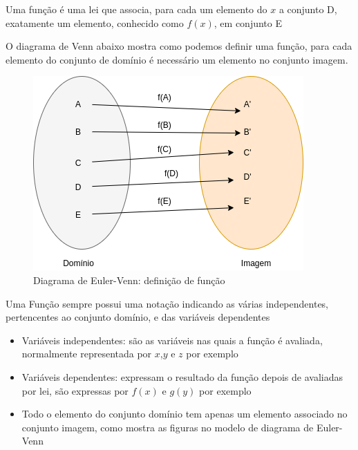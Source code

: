 \begin{multicols*}{2}
    \begin{theorem}
        Uma função é uma lei que associa, para cada um elemento do $x$ a conjunto D, exatamente 				um elemento, conhecido como $f(x)$, em conjunto E
    \end{theorem}

    O diagrama de Venn abaixo mostra como podemos definir uma função, para cada elemento do 				conjunto de domínio é necessário um elemento no conjunto imagem.

    \begin{figure}[H]
        \centering
        \caption{Diagrama de Euler-Venn: definição de função}
        \includegraphics[scale=0.4]{assets/rafael/img.png}
    \end{figure}
    Uma Função sempre possui uma notação indicando as várias independentes, pertencentes ao 				conjunto domínio, e das variáveis dependentes
    \begin{itemize}[wide, labelwidth=!, labelindent=0pt]
        \item Variáveis independentes: são as variáveis nas quais a função é avaliada, 											normalmente representada por $x$,$y$ e $z$ por exemplo
        \item Variáveis dependentes: expressam o resultado da função depois de avaliadas por 							lei, são expressas por $f(x)$ e $g(y)$ por exemplo
        \item Todo o elemento do conjunto domínio tem apenas um elemento associado no conjunto 							imagem, como mostra as figuras no modelo de diagrama de Euler-Venn
    \end{itemize}


\end{multicols*}
